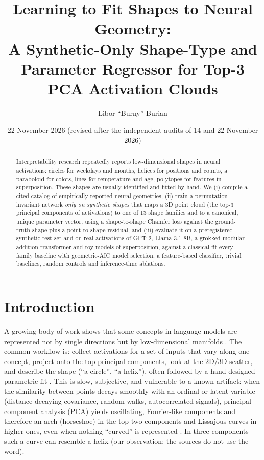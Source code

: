 \documentclass[10pt]{article}
\title{Learning to Fit Shapes to Neural Geometry:\\ A Synthetic-Only Shape-Type and Parameter Regressor for Top-3 PCA Activation Clouds}
\author{Libor ``Burny'' Burian}
\date{22 November 2026 (revised after the independent audits of 14 and 22 November 2026)}
\begin{document}
\maketitle

\begin{abstract}
Interpretability research repeatedly reports low-dimensional shapes in neural activations: circles for weekdays and months, helices for positions and counts, a paraboloid for colors, lines for temperature and age, polytopes for features in superposition. These shapes are usually identified and fitted by hand. We (i) compile a cited catalog of empirically reported neural geometries, (ii) train a permutation-invariant network \emph{only on synthetic shapes} that maps a 3D point cloud (the top-3 principal components of activations) to one of 13 shape families and to a canonical, unique parameter vector, using a shape-to-shape Chamfer loss against the ground-truth shape plus a point-to-shape residual, and (iii) evaluate it on a preregistered synthetic test set and on real activations of GPT-2, Llama-3.1-8B, a grokked modular-addition transformer and toy models of superposition, against a classical fit-every-family baseline with geometric-AIC model selection, a feature-based classifier, trivial baselines, random controls and inference-time ablations.

\end{abstract}

\section{Introduction}
A growing body of work shows that some concepts in language models are represented not by single directions but by low-dimensional manifolds \citep{engels2025notall,bhalla2026sae,gurnee2025linebreaks}. The common workflow is: collect activations for a set of inputs that vary along one concept, project onto the top principal components, look at the 2D/3D scatter, and describe the shape (``a circle'', ``a helix''), often followed by a hand-designed parametric fit \citep{kantamneni2025trig}. This is slow, subjective, and vulnerable to a known artifact: when the similarity between points decays smoothly with an ordinal or latent variable (distance-decaying covariance, random walks, autocorrelated signals), principal component analysis (PCA) yields oscillating, Fourier-like components and therefore an arch (horseshoe) in the top two components and Lissajous curves in higher ones, even when nothing ``curved'' is represented \citep{novembre2008horseshoe,diaconis2008horseshoes,antognini2018walks,shinn2023phantom}. In three components such a curve can resemble a helix (our observation; the sources do not use the word).
\end{document}
